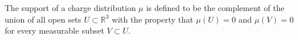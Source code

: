 The support of a charge distribution $\mu$ is defined to be the complement of the union of all open sets $U \subset \mathbb{R}^3$ with the property that $\mu(U) = 0$ and $\mu(V) = 0$ for every measurable subset $V \subset U$.
